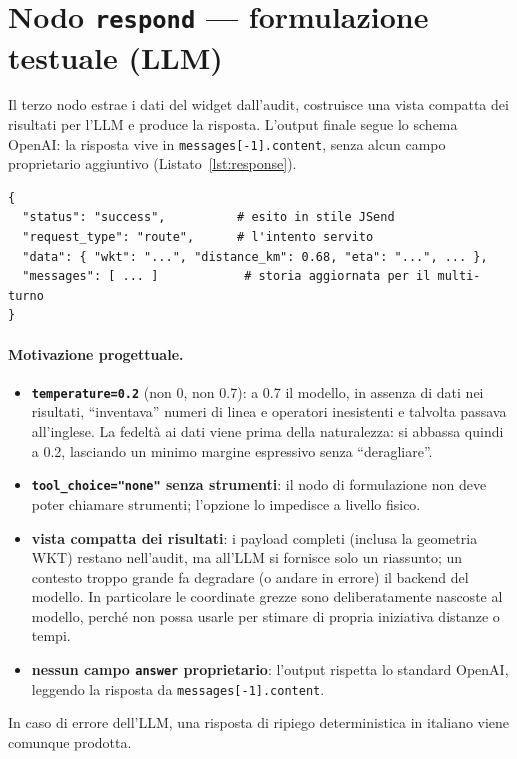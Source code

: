 \documentclass[11pt,a4paper]{article}
\begin{document}
\section{Nodo \texttt{respond} --- formulazione testuale (LLM)}
Il terzo nodo estrae i dati del widget dall'audit, costruisce una vista
compatta dei risultati per l'LLM e produce la risposta. L'output finale segue lo
schema OpenAI: la risposta vive in \texttt{messages[-1].content}, senza alcun
campo proprietario aggiuntivo (Listato~\ref{lst:response}).

\begin{lstlisting}[caption={Forma del widget JSON restituito.}, label={lst:response}]
{
  "status": "success",          # esito in stile JSend
  "request_type": "route",      # l'intento servito
  "data": { "wkt": "...", "distance_km": 0.68, "eta": "...", ... },
  "messages": [ ... ]            # storia aggiornata per il multi-turno
}
\end{lstlisting}

\paragraph{Motivazione progettuale.}
\begin{itemize}
  \item \textbf{\texttt{temperature=0.2}} (non 0, non 0.7): a 0.7 il modello, in
  assenza di dati nei risultati, ``inventava'' numeri di linea e operatori
  inesistenti e talvolta passava all'inglese. La fedeltà ai dati viene prima
  della naturalezza: si abbassa quindi a 0.2, lasciando un minimo margine
  espressivo senza ``deragliare''.
  \item \textbf{\texttt{tool\_choice="none"} senza strumenti}: il nodo di
  formulazione non deve poter chiamare strumenti; l'opzione lo impedisce a
  livello fisico.
  \item \textbf{vista compatta dei risultati}: i payload completi (inclusa la
  geometria WKT) restano nell'audit, ma all'LLM si fornisce solo un riassunto;
  un contesto troppo grande fa degradare (o andare in errore) il backend del
  modello. In particolare le coordinate grezze sono deliberatamente nascoste al
  modello, perché non possa usarle per stimare di propria iniziativa distanze o
  tempi.
  \item \textbf{nessun campo \texttt{answer} proprietario}: l'output rispetta lo
  standard OpenAI, leggendo la risposta da \texttt{messages[-1].content}.
\end{itemize}
In caso di errore dell'LLM, una risposta di ripiego deterministica in italiano
viene comunque prodotta.
\end{document}
